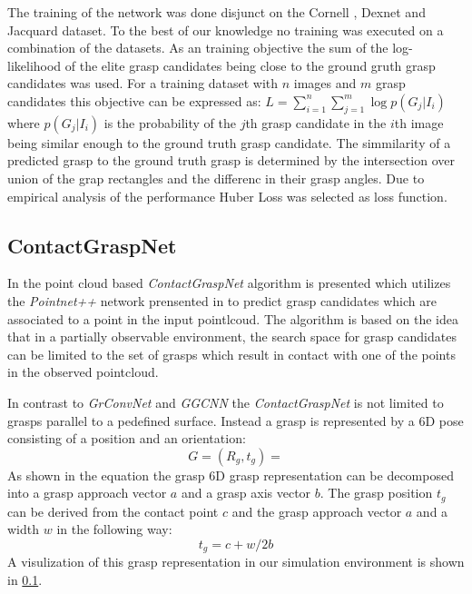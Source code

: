 The training of the network was done disjunct on the Cornell \cite{}, Dexnet \cite{} and Jacquard \cite{} dataset. To the best of our knowledge no training was executed on a combination of the datasets.
As an training objective the sum of the log-likelihood of the elite grasp candidates being close to the ground gruth grasp candidates was used.
For a training dataset with $n$ images and $m$ grasp candidates this objective can be expressed as:
$L = \sum_{i=1}^n \sum_{j=1}^m \log p(G_j|I_i)$
where $p(G_j|I_i)$ is the probability of the $j$th grasp candidate in the $i$th image being similar enough to the ground truth grasp candidate.
The simmilarity of a predicted grasp to the ground truth grasp is determined by the intersection over union of the grap rectangles and the differenc in their grasp angles.
Due to empirical analysis of the performance Huber Loss was selected as loss function.


\subsection{ContactGraspNet}
In \cite{sundermeyer2021contact} the point cloud based \textit{ContactGraspNet} algorithm is presented which utilizes the \textit{Pointnet++} network prensented in
\cite{} to predict grasp candidates which are associated to a point in the input pointlcoud.
The algorithm is based on the idea that in a partially observable environment, the search space for grasp candidates can be limited to the set of grasps which result
in contact with one of the points in the observed pointcloud.

In contrast to \textit{GrConvNet} and \textit{GGCNN} the \textit{ContactGraspNet} is not limited to grasps parallel to a pedefined surface.
Instead a grasp is represented by a 6D pose consisting of a position and an orientation:
$$ G = (R_g, t_g) = $$ %
As shown in the equation the grasp 6D grasp representation can be decomposed into a grasp approach vector $a$ and a grasp axis vector $b$.
The grasp position $t_g$ can be derived from the contact point $c$ and the grasp approach vector $a$ and a width $w$ in the following way:
$$ t_g = c + w / 2 b $$
A visulization of this grasp representation in our simulation environment is shown in \ref{}.

